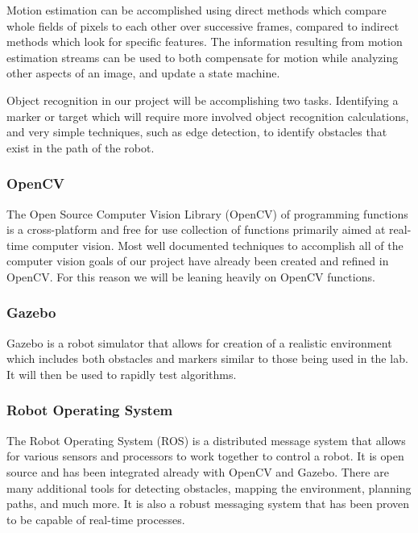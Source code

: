\documentclass{article}
\begin{document}
		Motion estimation can be accomplished using direct methods which compare whole fields of pixels to each other over successive frames, compared to indirect methods which look for specific features. The information resulting from motion estimation streams can be used to both compensate for motion while analyzing other aspects of an image, and update a state machine.
		
		Object recognition in our project will be accomplishing two tasks. Identifying a marker or target which will require more involved object recognition calculations, and very simple techniques, such as edge detection, to identify obstacles that exist in the path of the robot.
		
		\subsubsection{OpenCV}
		
		The Open Source Computer Vision Library (OpenCV) of programming functions is a cross-platform and free for use collection of functions primarily aimed at real-time computer vision\cite{opencv}. Most well documented techniques to accomplish all of the computer vision goals of our project have already been created and refined in OpenCV. For this reason we will be leaning heavily on OpenCV functions.
		
		\subsubsection{Gazebo}
		
		Gazebo is a robot simulator that allows for creation of a realistic environment which includes both obstacles and markers similar to those being used in the lab. It will then be used to rapidly test algorithms.
		
		\subsubsection{Robot Operating System}
		
		The Robot Operating System (ROS) is a distributed message system that allows for various sensors and processors to work together to control a robot. It is open source and has been integrated already with OpenCV and Gazebo. There are many additional tools for detecting obstacles, mapping the environment, planning paths, and much more. It is also a robust messaging system that has been proven to be capable of real-time processes.
		
\end{document}
